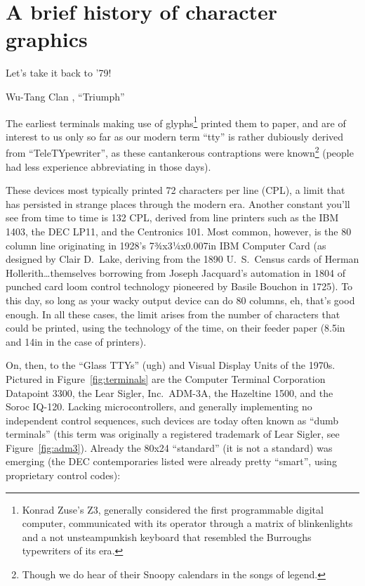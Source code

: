 \section{A brief history of character graphics}
\label{sec:terminals}
\epigraph{Let's take it back to '79!}{Wu-Tang Clan , ``Triumph''}
The earliest terminals making use of glyphs\footnote{Konrad Zuse's Z3, generally
 considered the first programmable digital computer, communicated with its
operator through a matrix of blinkenlights and a not unsteampunkish keyboard that resembled the
Burroughs typewriters of its era\cite{zuse}.} printed them to paper, and are of
interest to us only so far as our modern term ``tty'' is rather dubiously
derived from ``TeleTYpewriter'', as these cantankerous contraptions were
known\footnote{Though we do hear of their Snoopy calendars in the songs of
legend\cite{quiche}.} (people had less experience abbreviating in those days).

These devices most typically printed 72 characters per line (CPL), a limit that
has persisted in strange places\cite{pandoc} through the modern era. Another constant
you'll see from time to time is 132 CPL, derived from line printers such as the
IBM 1403, the DEC LP11, and the Centronics 101\cite{ibm1403}. Most common,
however, is the 80 column line originating in 1928's 7¾x3¼x0.007in IBM
Computer Card (as designed by Clair D.\ Lake, deriving from the 1890 U.\ S.\
Census cards of Herman Hollerith\ldots themselves borrowing from Joseph
Jacquard's automation in 1804 of punched card loom control technology pioneered
by Basile Bouchon in 1725\cite{cards}). To this day, so long as your wacky
output device can do 80 columns, eh, that's good enough. In all these cases,
the limit arises from the number of characters that could be printed, using the
technology of the time, on their feeder paper (8.5in and 14in in the case of
printers).

On, then, to the ``Glass TTYs'' (ugh) and Visual Display Units of the 1970s.
Pictured in Figure~\ref{fig:terminals} are the Computer Terminal Corporation
Datapoint 3300, the Lear Sigler, Inc.\ ADM-3A, the Hazeltine 1500, and the
Soroc IQ-120. Lacking microcontrollers, and generally implementing no
independent control sequences, such devices are today often known as ``dumb
terminals'' (this term was originally a registered trademark of Lear Sigler,
see Figure~\ref{fig:adm3}). Already the 80x24 ``standard'' (it is not a standard) was emerging
(the DEC contemporaries listed were already pretty ``smart'', using proprietary
control codes):


